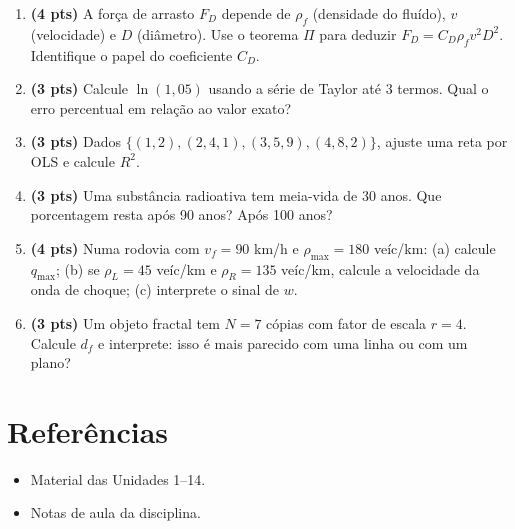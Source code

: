 \documentclass[12pt,a4paper]{article}
\begin{document}
\begin{enumerate}
  \item \textbf{(4 pts)} A for\c{c}a de arrasto $F_D$ depende de $\rho_f$ (densidade do flu\'ido), $v$ (velocidade) e $D$ (di\^ametro). Use o teorema $\Pi$ para deduzir $F_D = C_D \rho_f v^2 D^2$. Identifique o papel do coeficiente $C_D$.
  
  \item \textbf{(3 pts)} Calcule $\ln(1{,}05)$ usando a s\'erie de Taylor at\'e 3 termos. Qual o erro percentual em rela\c{c}\~ao ao valor exato?
  
  \item \textbf{(3 pts)} Dados $\{(1,2), (2,4{,}1), (3,5{,}9), (4,8{,}2)\}$, ajuste uma reta por OLS e calcule $R^2$.
  
  \item \textbf{(3 pts)} Uma subst\^ancia radioativa tem meia-vida de 30 anos. Que porcentagem resta ap\'os 90 anos? Ap\'os 100 anos?
  
  \item \textbf{(4 pts)} Numa rodovia com $v_f=90$ km/h e $\rho_\text{max}=180$ ve\'ic/km: (a) calcule $q_\text{max}$; (b) se $\rho_L=45$ ve\'ic/km e $\rho_R=135$ ve\'ic/km, calcule a velocidade da onda de choque; (c) interprete o sinal de $w$.
  
  \item \textbf{(3 pts)} Um objeto fractal tem $N=7$ c\'opias com fator de escala $r=4$. Calcule $d_f$ e interprete: isso \'e mais parecido com uma linha ou com um plano?
\end{enumerate}

\section*{Refer\^encias}
\begin{itemize}
  \item Material das Unidades 1--14.
  \item Notas de aula da disciplina.
\end{itemize}
\end{document}
